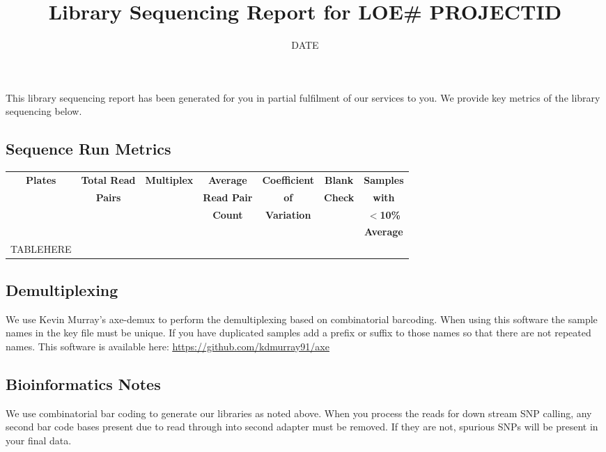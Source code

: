 \documentclass[hidelinks,12pt]{article}
\title{\textbf{Library Sequencing Report for LOE\# PROJECTID}\vspace{-3em}} %
\date{DATE \vspace{-2em}} %
\begin{document}
\maketitle
This library sequencing report has been generated for you in partial fulfilment of our services to you. 
We provide key metrics of the library sequencing below.

\subsection*{Sequence Run Metrics}

\begin{table}[h]
	\centering
	\begin{tabular}{|c|c|c|c|c|c|c|}
		\hline
		\textbf{Plates} & \textbf{Total Read} & \textbf{Multiplex} & \textbf{Average} & \textbf{Coefficient} & \textbf{Blank} & \textbf{Samples} \\
		{} & \textbf{Pairs} & {} & \textbf{Read Pair} & \textbf{of} & \textbf{Check} & \textbf{with} \\
		{} & {} & {} & \textbf{Count} & \textbf{Variation} & {} & \textbf{$<$10\%} \\
		{} & {} & {} & {} & {} & {} & \textbf{Average} \\
TABLEHERE
	\end{tabular}
\end{table}

\subsection*{Demultiplexing} 

We use Kevin Murray's axe-demux to perform the demultiplexing based on combinatorial barcoding. 
When using this software the sample names in the key file must be unique. 
If you have duplicated samples add a prefix or suffix to those names so that there are not repeated names. 
This software is available here: \newline \href{https://github.com/kdmurray91/axe}{\color{blue}\underline{https://github.com/kdmurray91/axe}}

\subsection*{Bioinformatics Notes}

We use combinatorial bar coding to generate our libraries as noted above. 
When you process the reads for down stream SNP calling, any second bar code bases present due to read through into second adapter must be removed. 
If they are not, spurious SNPs will be present in your final data.
\end{document}
